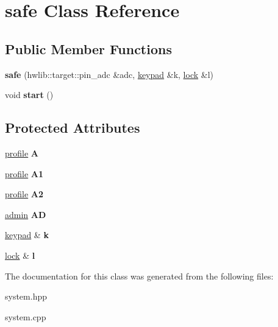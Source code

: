 \hypertarget{classsafe}{}\section{safe Class Reference}
\label{classsafe}
\subsection*{Public Member Functions}
\begin{DoxyCompactItemize}
\item 
{\bfseries safe} (hwlib\+::target\+::pin\+\_\+adc \&adc, \hyperlink{classkeypad}{keypad} \&k, \hyperlink{classlock}{lock} \&l)\hypertarget{classsafe_ae3645b3e465701a00e1cb6fa786f772e}{}\label{classsafe_ae3645b3e465701a00e1cb6fa786f772e}

\item 
void {\bfseries start} ()\hypertarget{classsafe_a709a3a799a6c106c8d50883914ccc03a}{}\label{classsafe_a709a3a799a6c106c8d50883914ccc03a}

\end{DoxyCompactItemize}
\subsection*{Protected Attributes}
\begin{DoxyCompactItemize}
\item 
\hyperlink{classprofile}{profile} {\bfseries A}\hypertarget{classsafe_a68e40174043d1954c274ad7cbcc7e29c}{}\label{classsafe_a68e40174043d1954c274ad7cbcc7e29c}

\item 
\hyperlink{classprofile}{profile} {\bfseries A1}\hypertarget{classsafe_a02a05377d7fc862452c5f461977f0e20}{}\label{classsafe_a02a05377d7fc862452c5f461977f0e20}

\item 
\hyperlink{classprofile}{profile} {\bfseries A2}\hypertarget{classsafe_a1bcc0402d972aca03985d479a395a2a9}{}\label{classsafe_a1bcc0402d972aca03985d479a395a2a9}

\item 
\hyperlink{classadmin}{admin} {\bfseries AD}\hypertarget{classsafe_af24bdb36687143e6cab27495f8c29a09}{}\label{classsafe_af24bdb36687143e6cab27495f8c29a09}

\item 
\hyperlink{classkeypad}{keypad} \& {\bfseries k}\hypertarget{classsafe_aa919f36ec08242082a3c776920281b3b}{}\label{classsafe_aa919f36ec08242082a3c776920281b3b}

\item 
\hyperlink{classlock}{lock} \& {\bfseries l}\hypertarget{classsafe_aa6a97bcf2bb11302c6c6342e4c922857}{}\label{classsafe_aa6a97bcf2bb11302c6c6342e4c922857}

\end{DoxyCompactItemize}


The documentation for this class was generated from the following files\+:\begin{DoxyCompactItemize}
\item 
system.\+hpp\item 
system.\+cpp\end{DoxyCompactItemize}

